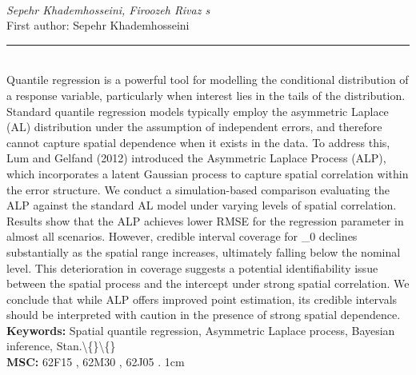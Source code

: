 \documentclass[10pt,twoside]{article}
\begin{document}
\noindent\begin{minipage}[t][\textheight]{\textwidth}
\\[0.35em]
{\itshape Sepehr Khademhosseini, Firoozeh Rivaz s}\\[0.2em]
{\footnotesize First author: Sepehr Khademhosseini}\\[0.45em]
\noindent\rule{\textwidth}{0.3pt}\\[0.4em]
{\footnotesize  Quantile regression is a powerful tool for modelling the conditional distribution of a response variable, particularly when interest lies in the tails of the distribution. Standard quantile regression models typically employ the asymmetric Laplace (AL) distribution under the assumption of independent errors, and therefore cannot capture spatial dependence when it exists in the data. To address this, Lum and Gelfand (2012) introduced the Asymmetric Laplace Process (ALP), which incorporates a latent Gaussian process to capture spatial correlation within the error structure. We conduct a simulation-based comparison evaluating the ALP against the standard AL model under varying levels of spatial correlation. Results show that the ALP achieves lower RMSE for the regression parameter in almost all scenarios. However, credible interval coverage for \_0 declines substantially as the spatial range increases, ultimately falling below the nominal level. This deterioration in coverage suggests a potential identifiability issue between the spatial process and the intercept under strong spatial correlation. We conclude that while ALP offers improved point estimation, its credible intervals should be interpreted with caution in the presence of strong spatial dependence.}\\[0.4em]
{\footnotesize\bfseries Keywords:} {\footnotesize Spatial quantile regression, Asymmetric Laplace process, Bayesian inference, Stan.\textbackslash\{\}\textbackslash\{\}}\\[0.15em]
{\footnotesize\bfseries MSC:} {\footnotesize 62F15 , 62M30 , 62J05 . 1cm}\\
\vfill
\end{minipage}
\newpage
\end{document}
